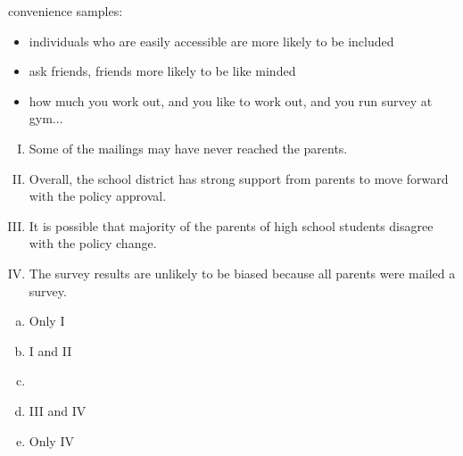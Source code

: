 \documentclass[slidestop,compress,mathserif,12pt,t,professionalfonts,xcolor=table]{beamer}
\newcommand{\solnMult}[1]{
\only<1>{#1}
\only<2->{\red{\textbf{#1}}}
}
\begin{document}
\begin{frame}
{convenience samples:
\begin{itemize}

\item individuals who are easily accessible are more likely to be included

\item ask friends, friends more likely to be like minded

\item how much you work out, and you like to work out, and you run survey at gym...

\end{itemize}

}

\end{frame}


\begin{frame}[shrink]

{\small
{}

\begin{enumerate}[I.]
\item Some of the mailings may have never reached the parents.
\item Overall, the school district has strong support from parents to move forward with 
the policy approval.
\item It is possible that majority of the parents of high school students disagree with 
the policy change.
\item The survey results are unlikely to be biased because all parents were mailed a 
survey. 
\end{enumerate}

\begin{multicols}{5}
\begin{enumerate}[(a)]
\item Only I
\item I and II
\item \solnMult{I and III}
\item III and IV
\item Only IV
\end{enumerate}
\end{multicols}
}

\end{frame}
\end{document}
